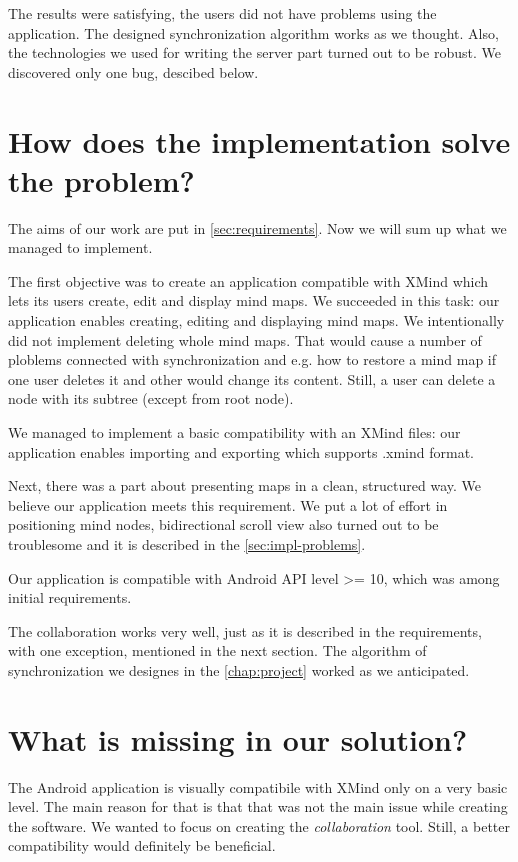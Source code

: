 The results were satisfying, the users did not have problems using the application. The designed synchronization algorithm works as we thought. Also, the technologies we used for writing the server part turned out to be robust. We discovered only one bug, descibed below. 

\section{How does the implementation solve the problem?}
\label{sec:summary-how-solve}
The aims of our work are put in \cref{sec:requirements}. Now we will sum up what we managed to implement. 
 
The first objective was to create an application compatible with XMind which lets its users create, edit and display mind maps. We succeeded in this task: our application enables creating, editing and displaying mind maps. 
We intentionally did not implement deleting whole mind maps. That would cause a number of ploblems connected with synchronization and e.g. how to restore a mind map if one user deletes it and other would change its content. Still, a user can delete a node with its subtree (except from root node).

We managed to implement a basic compatibility with an XMind files: our application enables importing and exporting which supports .xmind format. 

Next, there was a part about presenting maps in a clean, structured way. We believe our application meets this requirement. We put a lot of effort in positioning mind nodes, bidirectional scroll view also turned out to be troublesome and it is described in the \cref{sec:impl-problems}.

Our application is compatible with Android API level >= 10, which was among initial requirements.

The collaboration works very well, just as it is described in the requirements, with one exception, mentioned in the next section. The algorithm of synchronization we designes in the \cref{chap:project} worked  as we anticipated. 

\section{What is missing in our solution?}
\label{sec:summary-missing}
The Android application is visually compatibile with XMind only on a very basic level. The main reason for that is that that was not the main issue while creating the software. We wanted to focus on creating the \emph{collaboration} tool. Still, a better compatibility would definitely be beneficial. 

